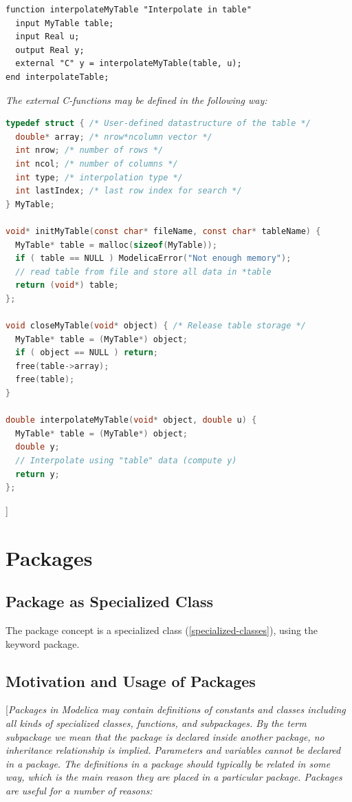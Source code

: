 \documentclass[10pt,a4paper]{report}
\def\doublelabel#1{\label{#1}\hypertarget{#1}{}}
\begin{document}
\begin{lstlisting}[language=modelica]
function interpolateMyTable "Interpolate in table"
  input MyTable table;
  input Real u;
  output Real y;
  external "C" y = interpolateMyTable(table, u);
end interpolateTable;
\end{lstlisting}
\emph{The external C-functions may be defined in the following way:}
\begin{lstlisting}[language=C]
typedef struct { /* User-defined datastructure of the table */
  double* array; /* nrow*ncolumn vector */
  int nrow; /* number of rows */
  int ncol; /* number of columns */
  int type; /* interpolation type */
  int lastIndex; /* last row index for search */
} MyTable;

void* initMyTable(const char* fileName, const char* tableName) {
  MyTable* table = malloc(sizeof(MyTable));
  if ( table == NULL ) ModelicaError("Not enough memory");
  // read table from file and store all data in *table
  return (void*) table;
};

void closeMyTable(void* object) { /* Release table storage */
  MyTable* table = (MyTable*) object;
  if ( object == NULL ) return;
  free(table->array);
  free(table);
}

double interpolateMyTable(void* object, double u) {
  MyTable* table = (MyTable*) object;
  double y;
  // Interpolate using "table" data (compute y)
  return y;
};
\end{lstlisting}
{]}

\chapter{Packages}\doublelabel{packages}

\section{Package as Specialized Class}\doublelabel{package-as-specialized-class}

The package concept is a specialized class (\ref{specialized-classes}), using the
keyword package.

\section{Motivation and Usage of Packages}\doublelabel{motivation-and-usage-of-packages}

{[}\emph{Packages in Modelica may contain definitions of constants and
classes including all kinds of specialized classes, functions, and
subpackages. By the term subpackage we mean that the package is declared
inside another package, no inheritance relationship is implied.
Parameters and variables cannot be declared in a package. The
definitions in a package should typically be related in some way, which
is the main reason they are placed in a particular package. Packages are
useful for a number of reasons:}
\end{document}
